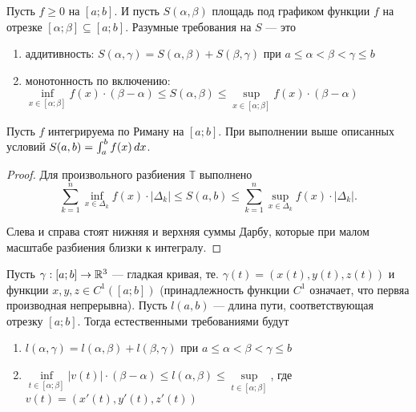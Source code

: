 \documentclass[a4paper]{article}
\theoremstyle{named}
\newcommand{\T}{\mathbb{T}}
\renewcommand{\int}{\intop}
\begin{document}
    	Пусть $f \geq 0$ на $[a; b]$. И пусть $S(\alpha, \beta)$ площадь под графиком функции $f$ на отрезке $[\alpha; \beta] \subseteq [a; b]$. Разумные требования на $S$ --- это

    	\begin{enumerate}
    	\item 
    		аддитивность: $S(\alpha, \gamma) = S(\alpha, \beta) + S(\beta, \gamma)$ при $a \leq \alpha < \beta < \gamma \leq b$

    	\item
    		монотонность по включению: $\inf\limits_{x \in [\alpha; \beta]} f(x) \cdot (\beta - \alpha) \leq S(\alpha, \beta) \leq \sup\limits_{x \in [\alpha; \beta]} f(x) \cdot (\beta - \alpha)$ 
    	\end{enumerate}

    	\begin{proposal*}
    		Пусть $f$ интегрируема по Риману на $[a; b]$. При выполнении выше описанных условий $S(a, b) = \int_a^b f(x) \dd x$.
    	\end{proposal*}

    	\begin{proof}
    		Для произвольного разбиения $\T$ выполнено
    		\begin{equation*}
    			\sum_{k = 1}^n \inf\limits_{x \in \Delta_k} f(x) \cdot |\Delta_k| \leq S(a, b) \leq \sum_{k = 1}^n \sup_{x \in \Delta_k} f(x) \cdot |\Delta_k|.
    		\end{equation*}

    		Слева и справа стоят нижняя и верхняя суммы Дарбу, которые при малом масштабе разбиения близки к интегралу.
    	\end{proof}

    	Пусть $\gamma: [a; b] \to \mathbb{R}^3$ --- гладкая кривая, те. $\gamma(t) = (x(t), y(t), z(t))$ и функции $x, y, z \in C^1([a; b])$ (принадлежность функции $C^1$ означает, что первяа производная непрерывна). Пусть $l(a, b)$ --- длина пути, соответствующая отрезку $[a; b]$. Тогда естественными требованиями будут

    	\begin{enumerate}
    	\item
    		$l(\alpha, \gamma) = l(\alpha, \beta) + l(\beta, \gamma)$ при $a \leq \alpha < \beta < \gamma \leq b$

    	\item
    		$\inf\limits_{t \in [\alpha; \beta]} |v(t)| \cdot (\beta - \alpha) \leq l(\alpha, \beta) \leq \sup\limits_{t \in [\alpha; \beta]}$, где $v(t) =  (x'(t), y'(t), z'(t))$
    	\end{enumerate}
\end{document}
